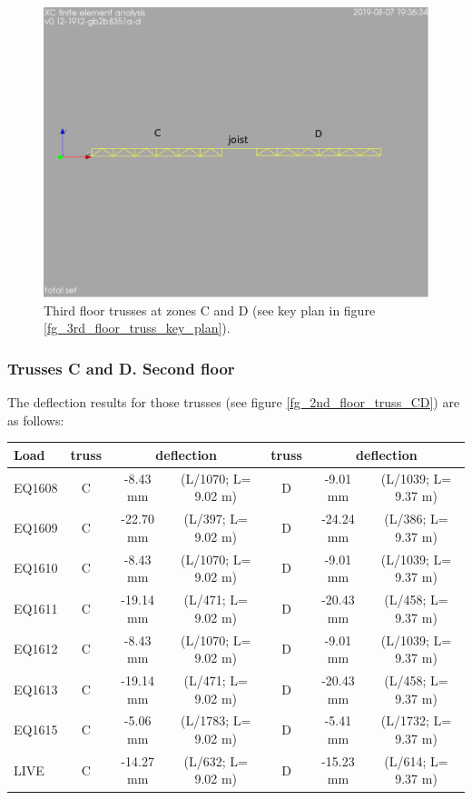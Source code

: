 \begin{figure}
  \begin{center}
  \includegraphics[width=120mm]{figures/floor_truss_CD}
  \end{center}
  \caption{Third floor trusses at zones C and D (see key plan in figure \ref{fg_3rd_floor_truss_key_plan}).}\label{fg_floor_truss_CD}
\end{figure}

\subsubsection{Trusses C and D. Second floor}
The deflection results for those trusses (see figure \ref{fg_2nd_floor_truss_CD}) are as follows:

\begin{center}
  \begin{scriptsize}
  \begin{tabular}{|l|c|c|c|c|c|c|}
    \hline
    \textbf{Load} & \textbf{truss} & \multicolumn{2}{c|}{\textbf{deflection}} & \textbf{truss} & \multicolumn{2}{c|}{\textbf{deflection}} \\
    \hline
EQ1608& C &-8.43  mm & (L/1070; L= 9.02 m) & D & -9.01  mm & (L/1039; L= 9.37 m)\\
EQ1609& C &-22.70  mm & (L/397; L= 9.02 m) & D & -24.24  mm & (L/386; L= 9.37 m)\\
EQ1610& C &-8.43  mm & (L/1070; L= 9.02 m) & D & -9.01  mm & (L/1039; L= 9.37 m)\\
EQ1611& C &-19.14  mm & (L/471; L= 9.02 m) & D & -20.43  mm & (L/458; L= 9.37 m)\\
EQ1612& C &-8.43  mm & (L/1070; L= 9.02 m) & D & -9.01  mm & (L/1039; L= 9.37 m)\\
EQ1613& C &-19.14  mm & (L/471; L= 9.02 m) & D & -20.43  mm & (L/458; L= 9.37 m)\\
EQ1615& C &-5.06  mm & (L/1783; L= 9.02 m) & D & -5.41  mm & (L/1732; L= 9.37 m)\\
LIVE& C &-14.27  mm & (L/632; L= 9.02 m) & D & -15.23  mm & (L/614; L= 9.37 m)\\
\hline
  \end{tabular}
  \end{scriptsize}
\end{center}

